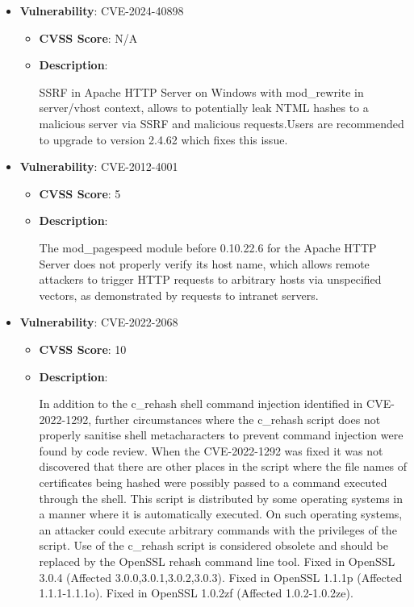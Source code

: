 \documentclass{article}
\begin{document}
\begin{itemize}
        \item \textbf{Vulnerability}: CVE-2024-40898
        \begin{itemize}
            \item \textbf{CVSS Score}:  N/A 
            \item \textbf{Description}:
            \parbox[t]{0.9\linewidth}{
                \ttfamily SSRF in Apache HTTP Server on Windows with mod\_rewrite in server/vhost context, allows to potentially leak NTML hashes to a malicious server via SSRF and malicious requests.Users are recommended to upgrade to version 2.4.62 which fixes this issue.
            }
        \end{itemize}
    
        \item \textbf{Vulnerability}: CVE-2012-4001
        \begin{itemize}
            \item \textbf{CVSS Score}:  5 
            \item \textbf{Description}:
            \parbox[t]{0.9\linewidth}{
                \ttfamily The mod\_pagespeed module before 0.10.22.6 for the Apache HTTP Server does not properly verify its host name, which allows remote attackers to trigger HTTP requests to arbitrary hosts via unspecified vectors, as demonstrated by requests to intranet servers.
            }
        \end{itemize}
    
        \item \textbf{Vulnerability}: CVE-2022-2068
        \begin{itemize}
            \item \textbf{CVSS Score}:  10 
            \item \textbf{Description}:
            \parbox[t]{0.9\linewidth}{
                \ttfamily In addition to the c\_rehash shell command injection identified in CVE-2022-1292, further circumstances where the c\_rehash script does not properly sanitise shell metacharacters to prevent command injection were found by code review. When the CVE-2022-1292 was fixed it was not discovered that there are other places in the script where the file names of certificates being hashed were possibly passed to a command executed through the shell. This script is distributed by some operating systems in a manner where it is automatically executed. On such operating systems, an attacker could execute arbitrary commands with the privileges of the script. Use of the c\_rehash script is considered obsolete and should be replaced by the OpenSSL rehash command line tool. Fixed in OpenSSL 3.0.4 (Affected 3.0.0,3.0.1,3.0.2,3.0.3). Fixed in OpenSSL 1.1.1p (Affected 1.1.1-1.1.1o). Fixed in OpenSSL 1.0.2zf (Affected 1.0.2-1.0.2ze).
            }
        \end{itemize}
    

\end{itemize}
\end{document}
